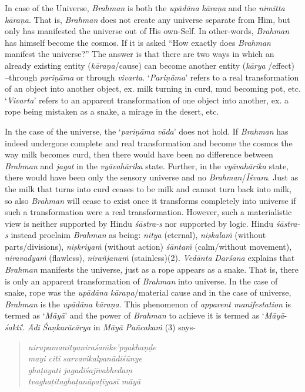 In case of the Universe, \emph{Brahman} is both the \emph{upādāna} \emph{kāraṇa} and the \emph{nimitta} \emph{kāraṇa}. That is, \emph{Brahman} does not create any universe separate from Him, but only has manifested the universe out of His own-Self. In other-words, \emph{Brahman} has himself become the cosmos. If it is asked ``How exactly does \emph{Brahman} manifest the universe?'' The answer is that there are two ways in which an already existing entity (\emph{kāraṇa}/cause) can become another entity (\emph{kārya} /effect) --through \emph{pariṇāma} or through \emph{vivarta}. `\emph{Pariṇāma}' refers to a real transformation of an object into another object, ex. milk turning in curd, mud becoming pot, etc. `\emph{Vivarta}' refers to an apparent transformation of one object into another, ex. a rope being mistaken as a snake, a mirage in the desert, etc.

In the case of the universe, the `\emph{pariṇāma} \emph{vāda}' does not hold. If \emph{Brahman} has indeed undergone complete and real transformation and become the cosmos the way milk becomes curd, then there would have been no difference between \emph{Brahman} and \emph{jagat} in the \emph{vyāvahārika} state. Further, in the \emph{vyāvahārika} state, there would have been only the sensory universe and no \emph{Brahman}/\emph{Īśvara}. Just as the milk that turns into curd ceases to be milk and cannot turn back into milk, so also \emph{Brahman} will cease to exist once it transforms completely into universe if such a transformation were a real transformation. However, such a materialistic view is neither supported by Hindu \emph{śāstra-s} nor supported by logic. Hindu \emph{śāstra-s} instead proclaim \emph{Brahman} as being: \emph{nitya} (eternal), \emph{niṣkalaṁ} (without parts/divisions), \emph{niṣkriyaṁ} (without action) \emph{śāntaṁ} (calm/without movement), \emph{niravadyaṁ} (flawless), \emph{nirañjanaṁ} (stainless)(2). \emph{Vedānta} \emph{Darśana} explains that \emph{Brahman} manifests the universe, just as a rope appears as a snake. That is, there is only an apparent transformation of \emph{Brahman} into universe. In the case of snake, rope was the \emph{upādāna} \emph{kāraṇa}/material cause and in the case of universe, \emph{Brahman} is the \emph{upādāna} \emph{kāraṇa}. This phenomenon of \emph{apparent manifestation} is termed as `\emph{Māyā}' and the power of \emph{Brahman} to achieve it is termed as `\emph{Māyā}-\emph{śakti}'. \emph{Ādi} \emph{Śaṇkarācārya} in \emph{Māyā} \emph{Pañcakaṁ} (3) says-

\begin{verse}
\emph{nirupamanityaniraśaṁke'pyakhaṇḍe}\\
\emph{mayi citi sarvavikalpanādiśūnye }\\
\emph{ghaṭayati jagadīśajīvabhedaṃ}\\
\emph{tvaghaṭitaghaṭanāpaṭīyasī māyā }
\end{verse}

